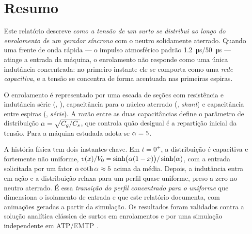 \section{Resumo}

Este relatório descreve \emph{como a tensão de um surto se distribui ao longo do enrolamento de um
gerador síncrono} com o neutro solidamente aterrado. Quando uma frente de onda rápida — o impulso
atmosférico padrão \SI{1.2}{\micro\second}/\SI{50}{\micro\second} — atinge a entrada da máquina, o
enrolamento não responde como uma única indutância concentrada: no primeiro instante ele se comporta
como uma \emph{rede capacitiva}, e a tensão se concentra de forma acentuada nas primeiras espiras.

O enrolamento é representado por uma escada de \Nsec{} seções com resistência e indutância série
(\Rsec, \Lsec), capacitância para o núcleo aterrado (\Cg, \emph{shunt}) e capacitância entre espiras
(\Cs, \emph{série}). A razão entre as duas capacitâncias define o parâmetro de distribuição
\(\alpha = \sqrt{C_g/C_s}\), que controla quão desigual é a repartição inicial da tensão. Para a
máquina estudada adota-se \(\alpha = 5\).

A história física tem dois instantes-chave. Em \(t = 0^+\), a distribuição é capacitiva e fortemente
não uniforme, \(v(x)/V_0 = \sinh\!\big(\alpha(1-x)\big)/\sinh(\alpha)\), com a entrada solicitada por
um fator \(\alpha\coth\alpha \approx 5\) acima da média. Depois, a indutância entra em ação e a
distribuição relaxa para um perfil quase uniforme, preso a zero no neutro aterrado. É essa
\emph{transição do perfil concentrado para o uniforme} que dimensiona o isolamento de entrada e que
este relatório documenta, com animações geradas a partir da simulação. Os resultados foram validados
contra a solução analítica clássica de surtos em enrolamentos \cite{greenwood1991} e por uma simulação
independente em ATP/EMTP \cite{dommel1969}.
